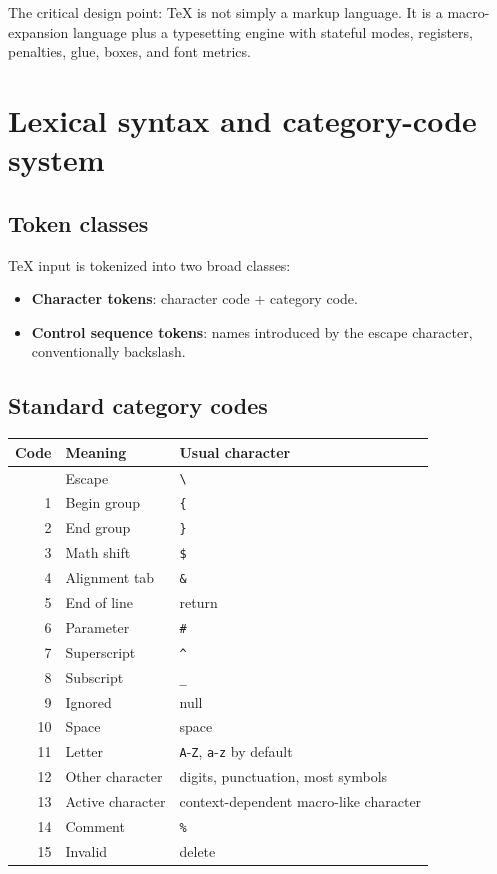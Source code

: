 \documentclass[11pt]{article}
\newcommand{\tightlist}{}
\begin{document}
The critical design point: TeX is not simply a markup language. It is a macro-expansion language plus a typesetting engine with stateful modes, registers, penalties, glue, boxes, and font metrics.

\section{Lexical syntax and category-code system}\label{lexical-syntax-and-category-code-system}

\subsection{Token classes}\label{token-classes}

TeX input is tokenized into two broad classes:

\begin{itemize}
\tightlist
\item
  \textbf{Character tokens}: character code + category code.
\item
  \textbf{Control sequence tokens}: names introduced by the escape character, conventionally backslash.
\end{itemize}

\subsection{Standard category codes}\label{standard-category-codes}

\begin{longtable}[]{@{}rll@{}}
\toprule\noalign{}
Code & Meaning & Usual character \\
\midrule\noalign{}
\endhead
\bottomrule\noalign{}
\endlastfoot
0 & Escape & \texttt{\textbackslash{}} \\
1 & Begin group & \texttt{\{} \\
2 & End group & \texttt{\}} \\
3 & Math shift & \texttt{\$} \\
4 & Alignment tab & \texttt{\&} \\
5 & End of line & return \\
6 & Parameter & \texttt{\#} \\
7 & Superscript & \texttt{\^} \\
8 & Subscript & \texttt{\_} \\
9 & Ignored & null \\
10 & Space & space \\
11 & Letter & \texttt{A}-\texttt{Z}, \texttt{a}-\texttt{z} by default \\
12 & Other character & digits, punctuation, most symbols \\
13 & Active character & context-dependent macro-like character \\
14 & Comment & \texttt{\%} \\
15 & Invalid & delete \\
\end{longtable}
\end{document}
